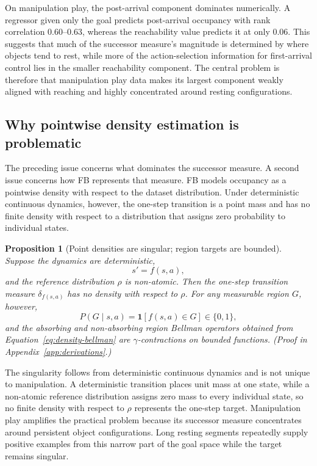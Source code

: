 \documentclass{article}
\newcommand{\ind}[1]{\mathbf{1}\!\left[#1\right]}
\newtheorem{proposition}{Proposition}
\begin{document}
On manipulation play, the post-arrival component dominates numerically.
A regressor given only the goal predicts post-arrival occupancy with rank correlation $0.60$--$0.63$, whereas the reachability value predicts it at only $0.06$.
This suggests that much of the successor measure's magnitude is determined by where objects tend to rest, while more of the action-selection information for first-arrival control lies in the smaller reachability component.
The central problem is therefore that manipulation play data makes its largest component weakly aligned with reaching and highly concentrated around resting configurations.

\subsection{Why pointwise density estimation is problematic}
\label{sec:failure}

The preceding issue concerns what dominates the successor measure.
A second issue concerns how FB represents that measure.
FB models occupancy as a pointwise density with respect to the dataset distribution.
Under deterministic continuous dynamics, however, the one-step transition is a point mass and has no finite density with respect to a distribution that assigns zero probability to individual states.

\begin{proposition}[Point densities are singular; region targets are bounded]
\label{prop:fixed-points}
Suppose the dynamics are deterministic,
\begin{equation}
s'=f(s,a),
\end{equation}
and the reference distribution $\rho$ is non-atomic.
Then the one-step transition measure $\delta_{f(s,a)}$ has no density with respect to $\rho$.
For any measurable region $G$, however,
\begin{equation}
P(G\mid s,a)=\ind{f(s,a)\in G}\in\{0,1\},
\end{equation}
and the absorbing and non-absorbing region Bellman operators obtained from Equation~\ref{eq:density-bellman} are $\gamma$-contractions on bounded functions.
(Proof in Appendix~\ref{app:derivations}.)
\end{proposition}

The singularity follows from deterministic continuous dynamics and is not unique to manipulation.
A deterministic transition places unit mass at one state, while a non-atomic reference distribution assigns zero mass to every individual state, so no finite density with respect to $\rho$ represents the one-step target.
Manipulation play amplifies the practical problem because its successor measure concentrates around persistent object configurations.
Long resting segments repeatedly supply positive examples from this narrow part of the goal space while the target remains singular.
\end{document}
